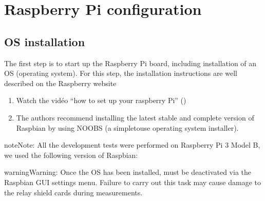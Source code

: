 \documentclass[letterpaper,10pt,english]{sphinxmanual}
\let\sphinxpxdimen\pdfpxdimen\else\newdimen\sphinxpxdimen
\begin{document}
\section{Raspberry Pi  configuration}
\label{\detokenize{V2_00:raspberry-pi-configuration}}

\subsection{OS installation}
\label{\detokenize{V2_00:os-installation}}
\sphinxAtStartPar
The first step is to start up the Raspberry Pi board, including installation of an OS (operating system).
For this step, the installation instructions are well described on the Raspberry website
\begin{enumerate}
%
\item {} 
\sphinxAtStartPar
Watch the vidéo “how to set up your raspberry Pi” ()

\item {} 
\sphinxAtStartPar
The authors recommend installing the latest stable and complete version of Raspbian by using NOOBS (a simple\sphinxhyphen{}to\sphinxhyphen{}use operating system installer).

\end{enumerate}

\begin{sphinxadmonition}{note}{Note:}
\sphinxAtStartPar
All the development tests were performed on Raspberry Pi 3 Model B, we used the following version of Raspbian:

\begin{figure}[H]
\centering

\noindent\sphinxincludegraphics[width=800\sphinxpxdimen,height=400\sphinxpxdimen]{{raspbian_version}.jpg}
\end{figure}
\end{sphinxadmonition}

\begin{sphinxadmonition}{warning}{Warning:}
\sphinxAtStartPar
Once the OS has been installed,   must be deactivated via the Raspbian GUI settings menu. Failure to carry out this task may cause damage to the relay shield cards during measurements.
\end{sphinxadmonition}
\end{document}
